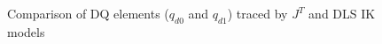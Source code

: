 \documentclass[runningheads, 11pt]{article}
\begin{document}
\begin{figure}[h]
	\hfill
	\caption{ Comparison of DQ elements ($q_{d0}$ and $q_{d1}$) traced by $J^T$ and DLS IK models \cite{fernandez2015}}  \label{fig:dqelements}
\end{figure}
\end{document}
